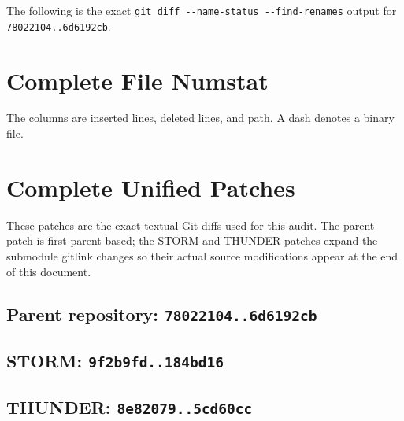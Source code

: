 \documentclass[10pt,a4paper]{article}
\newcommand{\commit}[1]{\texttt{#1}}
\newcommand{\file}[1]{\nolinkurl{#1}}
\begin{document}
The following is the exact \file{git diff --name-status --find-renames} output
for \commit{78022104..6d6192cb}.

\begin{landscape}
\end{landscape}

\section{Complete File Numstat}

The columns are inserted lines, deleted lines, and path.  A dash denotes a
binary file.

\begin{landscape}
\end{landscape}

\section{Complete Unified Patches}

These patches are the exact textual Git diffs used for this audit.  The parent
patch is first-parent based; the STORM and THUNDER patches expand the submodule
gitlink changes so their actual source modifications appear at the end of this
document.

\subsection{Parent repository: \commit{78022104..6d6192cb}}
\begin{landscape}
\end{landscape}

\subsection{STORM: \commit{9f2b9fd..184bd16}}
\begin{landscape}
\end{landscape}

\subsection{THUNDER: \commit{8e82079..5cd60cc}}
\begin{landscape}
\end{landscape}
\end{document}
